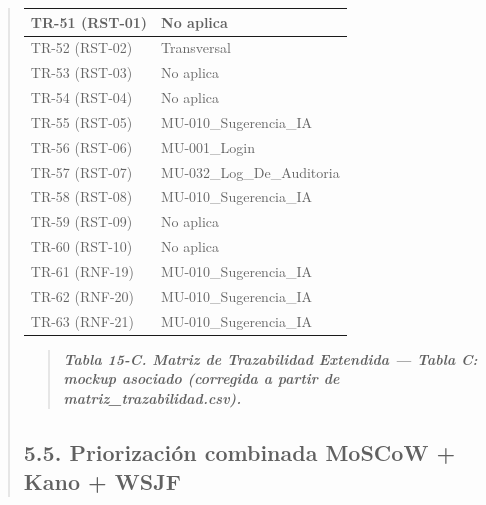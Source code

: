 \documentclass[
]{article}
\begin{document}
\begin{quote}
{\begin{longtable}[]{|
  >{\centering\arraybackslash}p{}|
  >{\raggedright\arraybackslash}p{}|}
\hline
TR-51 (RST-01) & No aplica \\
\hline
TR-52 (RST-02) & Transversal \\
\hline
TR-53 (RST-03) & No aplica \\
\hline
TR-54 (RST-04) & No aplica \\
\hline
TR-55 (RST-05) & MU-010\_Sugerencia\_IA \\
\hline
TR-56 (RST-06) & MU-001\_Login \\
\hline
TR-57 (RST-07) & \begin{minipage}[t]{\linewidth}\raggedright
MU-032\_Log\_De\_Auditoria
\end{minipage} \\
\hline
TR-58 (RST-08) & MU-010\_Sugerencia\_IA \\
\hline
TR-59 (RST-09) & No aplica \\
\hline
TR-60 (RST-10) & No aplica \\
\hline
TR-61 (RNF-19) & MU-010\_Sugerencia\_IA \\
\hline
TR-62 (RNF-20) & MU-010\_Sugerencia\_IA \\
\hline
TR-63 (RNF-21) & MU-010\_Sugerencia\_IA \\
\hline
\end{longtable}
}

\begin{quote}
\protect{}\label{table15c}{}\emph{\textbf{Tabla 15-C. Matriz de
Trazabilidad Extendida --- Tabla C: mockup asociado (corregida a partir de matriz\_trazabilidad.csv).}}
\end{quote}

\subsection{5.5. Priorización combinada MoSCoW + Kano + WSJF}\label{priorizacion-wsjf}


\end{quote}
\end{document}
